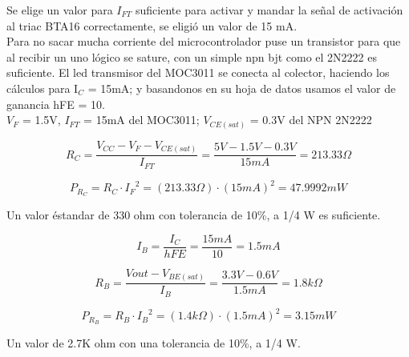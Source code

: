     Se elige un valor para $I_{FT}$ suficiente para activar y mandar la señal de activación al triac BTA16 correctamente, se eligió un valor de 15 mA.\\
    
    Para no sacar mucha corriente del microcontrolador puse un transistor para que al recibir un uno lógico se sature, con un simple npn bjt como el 2N2222 es suficiente. El led transmisor del MOC3011 se conecta al colector, haciendo los cálculos para I$_{C}$ = 15mA; y basandonos en su hoja de datos usamos el valor de ganancia hFE = 10.\\
    
    $V_F$ = 1.5V, $I_{FT}$ = 15mA del MOC3011;  $V_{CE(sat)}$ = 0.3V del NPN 2N2222
    
    \begin{equation}
        R_{C} 
        =   \frac { V_{CC} - V_{F} - V_{CE(sat)} } { I_{FT} }
        =   \frac { 5V - 1.5V - 0.3V } { 15mA }
        =   213.33\Omega
    \end{equation}
     
    \begin{equation}
        P_{ R_{C} }
        =   R_{C} \cdot {I_{F}}^2
        =   (213.33\Omega) \cdot (15mA)^2
        =   47.9992mW
    \end{equation}
    
    \begin{center}
        Un valor éstandar de 330 ohm con tolerancia de 10\%, a 1/4 W es suficiente.\\
    \end{center}
    
    \begin{equation}
        I_{B}   
        =   \frac { I_{C} } { hFE }
        =   \frac { 15mA } { 10 }
        =   1.5mA
    \end{equation}

    \begin{equation}
        R_{B}   
        =   \frac { Vout - V_{BE(sat)} } { I_{B} }
        =   \frac { 3.3V - 0.6V } { 1.5mA }
        =   1.8k\Omega
    \end{equation}
    
    \begin{equation}
        P_{R_{B}}
        =   R_{B} \cdot {I_{B}}^2
        =   (1.4k\Omega) \cdot (1.5mA)^2
        =   3.15mW
    \end{equation}
    
    \begin{center}
        Un valor de 2.7K ohm con una tolerancia de 10\%, a 1/4 W.\\
    \end{center}
    
